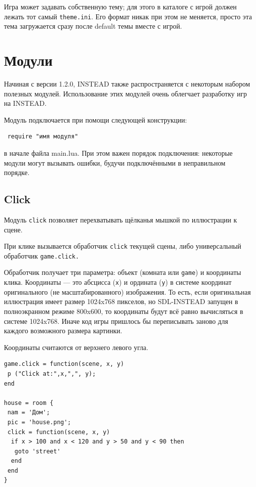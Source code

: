 \documentclass[12pt]{article}
\begin{document}
Игра может задавать собственную тему; для этого в каталоге с игрой должен лежать тот самый \verb/theme.ini/. Его формат никак при этом не меняется, просто эта тема загружается сразу после default темы вместе с игрой.

\section{Модули}

Начиная с версии 1.2.0, INSTEAD также распространяется с некоторым набором полезных модулей. Использование этих модулей очень облегчает разработку игр на INSTEAD.

Модуль подключается при помощи следующей конструкции:

\begin{verbatim}
 require "имя модуля"
\end{verbatim}

в начале файла main.lua. При этом важен порядок подключения: некоторые модули могут вызывать ошибки, будучи подключёнными в неправильном порядке.

\subsection{Click}

Модуль \verb/click/ позволяет перехватывать щёлканья мышкой по иллюстрации к сцене.

При клике вызывается обработчик \verb/click/ текущей сцены, либо универсальный обработчик \verb/game.click./

Обработчик получает три параметра: объект (комната или \verb/game/) и координаты клика. Координаты — это абсцисса (\verb/x/) и ордината (\verb/y/) в системе координат оригинального (не масштабированного) изображения. То есть, если оригинальная иллюстрация имеет размер 1024x768 пикселов, но SDL-INSTEAD запущен в полноэкранном режиме 800x600, то координаты будут всё равно вычисляться в системе 1024x768. Иначе код игры пришлось бы переписывать заново для каждого возможного размера картинки.

Координаты считаются от верхнего левого угла.

\begin{verbatim}
game.click = function(scene, x, y)
 p ("Click at:",x,",", y);
end

house = room {
 nam = 'Дом';
 pic = 'house.png';
 click = function(scene, x, y)
  if x > 100 and x < 120 and y > 50 and y < 90 then
   goto 'street'
  end
 end
}
\end{verbatim}
\end{document}
